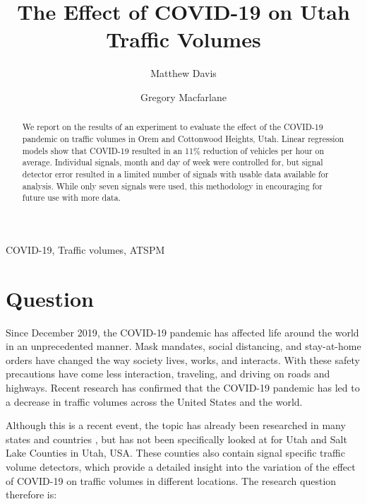 \documentclass[3p, authoryear]{elsarticle} %
\begin{document}
\begin{frontmatter}

  \title{The Effect of COVID-19 on Utah Traffic Volumes}
    \author[Brigham Young University]{Matthew Davis}
    \author[Brigham Young University]{Gregory Macfarlane}
      \address[Brigham Young University]{Civil and Environmental Engineering Department, 430 Engineering Building, Provo, Utah 84602}
  
  \begin{abstract}
  We report on the results of an experiment to evaluate the effect of the COVID-19 pandemic on traffic volumes in Orem and Cottonwood Heights, Utah. Linear regression models show that COVID-19 resulted in an 11\% reduction of vehicles per hour on average. Individual signals, month and day of week were controlled for, but signal detector error resulted in a limited number of signals with usable data available for analysis. While only seven signals were used, this methodology in encouraging for future use with more data.
  \end{abstract}
   \begin{keyword} COVID-19, Traffic volumes, ATSPM\end{keyword}
 \end{frontmatter}

\hypertarget{intro}{%
\section{Question}\label{intro}}

Since December 2019, the COVID-19 pandemic has affected life around the world in an unprecedented manner. Mask mandates, social distancing, and stay-at-home orders have changed the way society lives, works, and interacts. With these safety precautions have come less interaction, traveling, and driving on roads and highways. Recent research has confirmed that the COVID-19 pandemic has led to a decrease in traffic volumes across the United States and the world.

Although this is a recent event, the topic has already been researched in many states and countries \citep{Lee2020, Lee2021, Muley2021}, but has not been specifically looked at for Utah and Salt Lake Counties in Utah, USA. These counties also contain signal specific traffic volume detectors, which provide a detailed insight into the variation of the effect of COVID-19 on traffic volumes in different locations. The research question therefore is:
\end{document}
